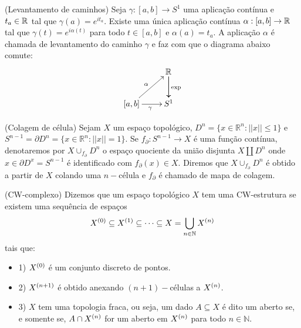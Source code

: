 \documentclass{beamer}
\begin{document}
\begin{frame}
	
	\begin{proposicao}
		(Levantamento de caminhos) Seja $\gamma:[a,b] \to S^{1}$ uma aplicação contínua e $t_{a}\in \mathbb{R}^{}$ tal que $\gamma(a) = e^{it_{a}}$. Existe uma única aplicação contínua $\alpha:[a,b] \to \mathbb{R}^{}$ tal que $\gamma(t) = e^{i\alpha(t)}$ para todo $t\in [a,b]$ e $\alpha(a) = t_{a}$. A aplicação $\alpha$ é chamada de levantamento do caminho $\gamma$ e faz com que o diagrama abaixo comute:
		$$
		\xymatrix{
			& \real{}\ar[d]\ar[d]^{\text{exp}}
			\\
			[a,b]\ar[ur]^{\alpha} \ar[r]_{\gamma} & S^{1}
		}
		$$
	\end{proposicao}
	
\end{frame}

\begin{frame}
	\begin{definicao}
		(Colagem de célula) Sejam $X$ um espaço topológico, $D^{n}=\{x\in \mathbb{R}^{n} : ||x|| \leq 1\}$ e $S^{n-1} = \partial D^{n}=\{x\in \mathbb{R}^{n} : ||x|| = 1\}$. Se $f_{\partial}:S^{n-1} \to X$ é uma função contínua, denotaremos por $X\cup_{f_{\partial}}D^{n}$ o espaço quociente da união disjunta $X \coprod D^{n}$ onde $x \in \partial D^{x} = S^{n-1}$ é identificado com $f_{\partial}(x) \in X$. Diremos que $X\cup_{f_{\partial}}D^{n}$ é obtido a partir de $X$ colando uma $n-$célula e $f_{\partial}$ é chamado de mapa de colagem.
	\end{definicao}
\end{frame}

\begin{frame}
	
	\begin{definicao}
		(CW-complexo) Dizemos que um espaço topológico $X$ tem uma CW-estrutura se existem uma sequência de espaços
		$$
		X^{(0)} \subseteq X^{(1)} \subseteq \dots \subseteq X = \bigcup \limits_{n\in \mathbb{N}} X^{(n)}
		$$ 
		tais que:
		\begin{itemize}
			\item 1) $X^{(0)}$ é um conjunto discreto de pontos.
			
			\item 2) $X^{(n+1)}$ é obtido anexando $(n+1)-$células a $X^{(n)}$.
			
			\item 3) $X$ tem uma topologia fraca, ou seja, um dado $A \subseteq X$ é dito um aberto se, e somente se, $A \cap X^{(n)}$ for um aberto em $X^{(n)}$ para todo $n \in \mathbb{N}$.
		\end{itemize}
	\end{definicao}
\end{frame}
\end{document}

